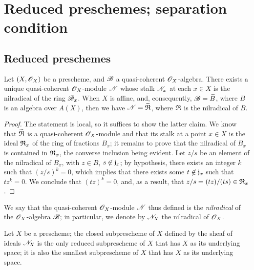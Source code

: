 \section{Reduced preschemes; separation condition}
\label{section:reduced-preschemes-and-separation-condition}

\subsection{Reduced preschemes}
\label{subsection:reduced-preschemes}

\begin{prop}[5.1.1]
\label{1.5.1.1}
Let $(X,\mathscr{O}_X)$ be a prescheme, and $\mathscr{B}$ a quasi-coherent $\mathscr{O}_X$-algebra.
There exists a unique quasi-coherent $\mathscr{O}_X$-module $\mathscr{N}$ whose stalk $\mathscr{N}_x$ at each $x\in X$ is the nilradical of the ring $\mathscr{B}_x$.
When $X$ is affine, and, consequently, $\mathscr{B}={\widetilde{B}}$, where $B$ is an algebra over $A(X)$, then we have $\mathscr{N}={\widetilde{\mathfrak{R}}}$, where $\mathfrak{R}$ is the nilradical of $B$.
\end{prop}

\begin{proof}
\label{proof-1.5.1.1}
The statement is local, so it suffices to show the latter claim.
We know that ${\widetilde{\mathfrak{R}}}$ is a quasi-coherent $\mathscr{O}_X$-module  and that its stalk at a point $x\in X$ is the ideal $\mathfrak{R}_x$ of the ring of fractions $B_x$;
it remains to prove that the nilradical of $B_x$ is contained in $\mathfrak{R}_x$, the converse inclusion being evident.
Let $z/s$ be an element of the nilradical of $B_x$, with $z\in B$, $s\not\in\mathfrak{j}_x$;
by hypothesis, there exists an integer $k$ such that $(z/s)^k=0$, which implies that there exists some $t\not\in\mathfrak{j}_x$ such that $tz^k=0$.
We conclude that $(tz)^k=0$, and, as a result, that $z/s=(tz)/(ts)\in\mathfrak{R}_x$.
\end{proof}

We say that the quasi-coherent $\mathscr{O}_X$-module $\mathscr{N}$ thus defined is the \emph{nilradical} of the $\mathscr{O}_X$-algebra $\mathscr{B}$; in particular, we denote by $\mathscr{N}_X$ the nilradical of $\mathscr{O}_X$.

\begin{cor}[5.1.2]
\label{1.5.1.2}
Let $X$ be a prescheme;
the closed subprescheme of $X$ defined by the sheaf of ideals $\mathscr{N}_X$ is the only reduced subprescheme  of $X$ that has $X$ as its underlying space;
it is also the smallest subprescheme of $X$ that has $X$ as its underlying space.
\end{cor}

